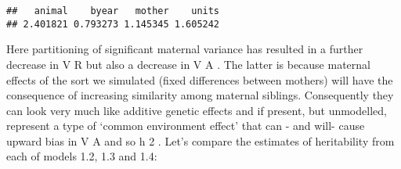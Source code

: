 \documentclass[12pt,]{book}
\newenvironment{Shaded}{\begin{snugshade}}{\end{snugshade}}
\newcommand{\DataTypeTok}[1]{\textcolor[rgb]{0.13,0.29,0.53}{#1}}
\newcommand{\DecValTok}[1]{\textcolor[rgb]{0.00,0.00,0.81}{#1}}
\newcommand{\FloatTok}[1]{\textcolor[rgb]{0.00,0.00,0.81}{#1}}
\newcommand{\KeywordTok}[1]{\textcolor[rgb]{0.13,0.29,0.53}{\textbf{#1}}}
\newcommand{\NormalTok}[1]{#1}
\newcommand{\OperatorTok}[1]{\textcolor[rgb]{0.81,0.36,0.00}{\textbf{#1}}}
\newcommand{\OtherTok}[1]{\textcolor[rgb]{0.56,0.35,0.01}{#1}}
\newcommand{\StringTok}[1]{\textcolor[rgb]{0.31,0.60,0.02}{#1}}
\begin{document}
\begin{Shaded}
\end{Shaded}

\begin{verbatim}
##   animal    byear   mother    units 
## 2.401821 0.793273 1.145345 1.605242
\end{verbatim}

Here partitioning of significant maternal variance has resulted in a further decrease in V R but also a decrease in V A . The latter is because maternal effects of the sort we simulated (fixed differences between mothers) will have the consequence of increasing similarity among maternal siblings. Consequently they can look very much like additive genetic effects and if present, but unmodelled, represent a type of `common environment effect' that can - and will- cause upward bias in V A and so h 2 . Let's compare the estimates of heritability from each of models 1.2, 1.3 and 1.4:
\end{document}
